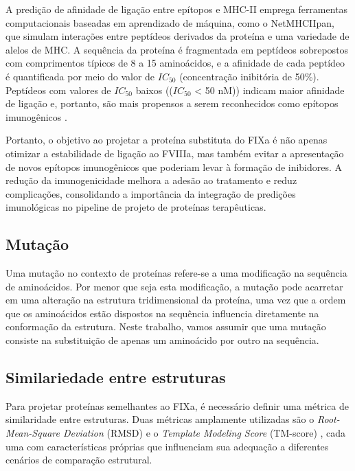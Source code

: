 A predição de afinidade de ligação entre epítopos e MHC-II emprega ferramentas computacionais baseadas em aprendizado de máquina,
como o NetMHCIIpan, que simulam interações entre peptídeos derivados da proteína e uma variedade de alelos de MHC. 
A sequência da proteína é fragmentada em peptídeos sobrepostos com comprimentos típicos de 8 a 15 aminoácidos,
e a afinidade de cada peptídeo é quantificada por meio do valor de $IC_{50}$ (concentração inibitória de 50\%).
Peptídeos com valores de $IC_{50}$ baixos (($IC_{50}$ < 50 nM)) indicam maior afinidade de ligação e, portanto, 
são mais propensos a serem reconhecidos como epítopos imunogênicos \cite{Imuno}.

Portanto, o objetivo ao projetar a proteína substituta do FIXa é não apenas otimizar a estabilidade de ligação ao FVIIIa, 
mas também evitar a apresentação de novos epítopos imunogênicos que poderiam levar à formação de inibidores. 
A redução da imunogenicidade melhora a adesão ao tratamento e reduz complicações, 
consolidando a importância da integração de predições imunológicas no pipeline de projeto de proteínas terapêuticas.


\subsection{Mutação}
Uma mutação no contexto de proteínas refere-se a uma modificação na sequência de aminoácidos. 
Por menor que seja esta modificação, a mutação pode acarretar em uma alteração na estrutura tridimensional da proteína,
uma vez que a ordem que os aminoácidos estão dispostos na sequência influencia diretamente na conformação da estrutura. 
Neste trabalho, vamos assumir que uma mutação consiste na substituição de apenas um aminoácido por outro na sequência. 

\subsection{Similariedade entre estruturas}
\label{subsection:TMScore}  
Para projetar proteínas semelhantes ao FIXa, é necessário definir uma métrica de similaridade entre estruturas.
Duas métricas amplamente utilizadas são o \textit{Root-Mean-Square Deviation} (RMSD) 
e o \textit{Template Modeling Score} (TM-score) \cite{tmscore},
cada uma com características próprias que influenciam sua adequação a diferentes cenários de comparação estrutural.


